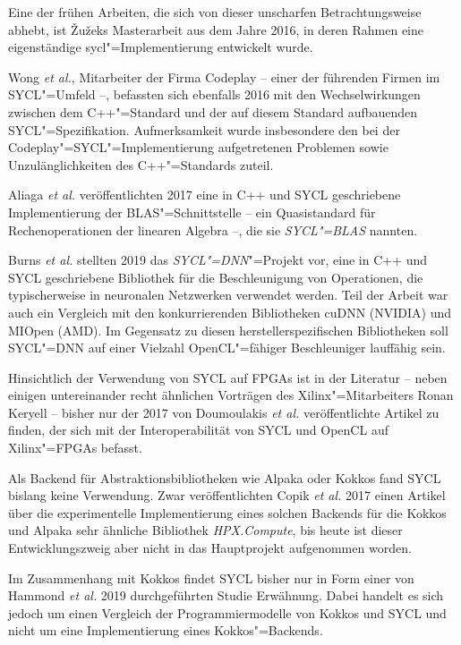 Eine der frühen Arbeiten, die sich von dieser unscharfen Betrachtungsweise
abhebt, ist Žužeks Masterarbeit aus dem Jahre 2016, in deren Rahmen eine
eigenständige \gls{sycl}"=Implementierung entwickelt wurde.
\cite[vgl.][]{zuzek2016}

Wong \textit{et al.}, Mitarbeiter der Firma Codeplay -- einer der führenden
Firmen im SYCL"=Umfeld --, befassten sich ebenfalls 2016 mit den
Wechselwirkungen zwischen dem C++"=Standard und der auf diesem Standard
aufbauenden SYCL"=Spezifikation. Aufmerksamkeit wurde insbesondere den bei der
Codeplay"=SYCL"=Implementierung aufgetretenen Problemen sowie Unzulänglichkeiten
des C++"=Standards zuteil.
\cite[vgl.][]{wong2016}

Aliaga \textit{et al.} veröffentlichten 2017 eine in C++ und SYCL geschriebene
Implementierung der BLAS"=Schnittstelle -- ein Quasistandard für
Rechenoperationen der linearen Algebra --, die sie \textit{SYCL"=BLAS} nannten.
\cite[vgl.][]{aliaga2017}

Burns \textit{et al.} stellten 2019 das \textit{SYCL"=DNN}"=Projekt vor, eine in
C++ und SYCL geschriebene Bibliothek für die Beschleunigung von Operationen, die
typischerweise in neuronalen Netzwerken verwendet werden. Teil der Arbeit war
auch ein Vergleich mit den konkurrierenden Bibliotheken cuDNN (NVIDIA) und
MIOpen (AMD). Im Gegensatz zu diesen herstellerspezifischen Bibliotheken soll
SYCL"=DNN auf einer Vielzahl OpenCL"=fähiger Beschleuniger lauffähig sein.
\cite[vgl.][]{burns2019}

Hinsichtlich der Verwendung von SYCL auf FPGAs ist in der Literatur -- neben
einigen untereinander recht ähnlichen Vorträgen des Xilinx"=Mitarbeiters Ronan
Keryell -- bisher nur der 2017 von Doumoulakis \textit{et al.} veröffentlichte
Artikel zu finden, der sich mit der Interoperabilität von SYCL und OpenCL auf
Xilinx"=FPGAs befasst.
\cite[vgl.][]{doumoulakis2017}

Als Backend für Abstraktionsbibliotheken wie Alpaka oder Kokkos fand SYCL
bislang keine Verwendung. Zwar veröffentlichten Copik \textit{et al.} 2017 einen
Artikel über die experimentelle Implementierung eines solchen Backends für die
Kokkos und Alpaka sehr ähnliche Bibliothek \textit{HPX.Compute}, bis heute ist
dieser Entwicklungszweig aber nicht in das Hauptprojekt aufgenommen worden.
\cite[vgl.][]{copik2017}

Im Zusammenhang mit Kokkos findet SYCL bisher nur in Form einer von Hammond
\textit{et al.} 2019 durchgeführten Studie Erwähnung. Dabei handelt es sich
jedoch um einen Vergleich der Programmiermodelle von Kokkos und SYCL und nicht
um eine Implementierung eines Kokkos"=Backends.
\cite[vgl.][]{hammond2019}


